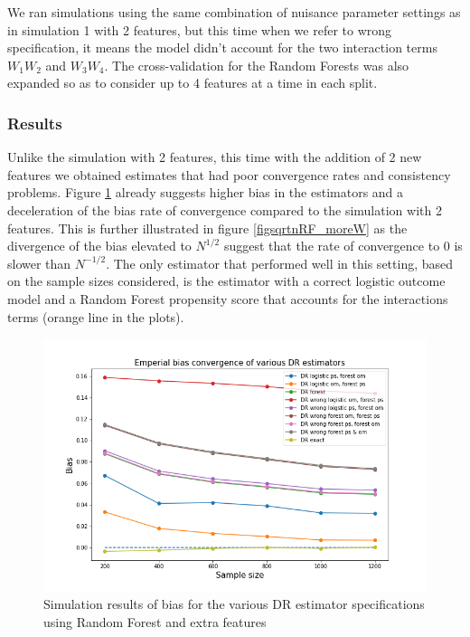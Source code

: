 \documentclass[12pt,twoside]{article}
\begin{document}
We ran simulations using the same combination of nuisance parameter settings as in simulation 1 with 2 features, but this time when we refer to wrong specification, it means the model didn't account for the two interaction terms $W_1W_2$ and $W_3W_4$. The cross-validation for the Random Forests was also expanded so as to consider up to 4 features at a time in each split. 

\subsubsection*{Results}

Unlike the simulation with 2 features, this time with the addition of 2 new features we obtained estimates that had poor convergence rates and consistency problems. Figure \ref{figbiasRF_moreW} already suggests higher bias in the estimators and a deceleration of the bias rate of convergence compared to the simulation with 2 features. This is further illustrated in figure \ref{figsqrtnRF_moreW} as the divergence of the bias elevated to $N^{1/2}$ suggest that the rate of convergence to 0 is slower than $N^{-1/2}$. The only estimator that performed well in this setting, based on the sample sizes considered, is the estimator with a correct logistic outcome model and a Random Forest propensity score that accounts for the interactions terms (orange line in the plots). 

\begin{figure}[h!]
    \centering
    \includegraphics[width = 0.9\columnwidth]{figures/biasRF_moreW.png}
    \caption{Simulation results of bias for the various DR estimator specifications using Random Forest and extra features}
    \label{figbiasRF_moreW}
\end{figure}
\end{document}
